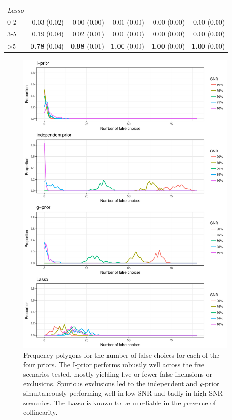 \documentclass[showframe,11pt,twoside,openright]{report}
\begin{document}
\begin{table}[htb]
\begin{tabular}{lrrrrr}
\\
\emph{Lasso}\\
\hspace{0.5em}0-2 & 0.03 (0.02) & 0.00 (0.00) & 0.00 (0.00) & 0.00 (0.00) & 0.00 (0.00) \\
\hspace{0.5em}3-5 & 0.19 (0.04) & 0.02 (0.01) & 0.00 (0.00) & 0.00 (0.00) & 0.00 (0.00) \\
\hspace{0.5em}>5  & \textbf{0.78} (0.04) & \textbf{0.98} (0.01) & \textbf{1.00} (0.00) & \textbf{1.00} (0.00) & \textbf{1.00} (0.00) \\ 
\bottomrule
\end{tabular}
\end{table}

\begin{figure}[p]
  \centering
  \includegraphics[width=0.991\textwidth]{figure/bvs_simres}
  \caption[Frequency polygons for the number of false choices]{Frequency polygons for the number of false choices for each of the four priors. The I-prior performs robustly well across the five scenarios tested, mostly yielding five or fewer false inclusions or exclusions. Spurious exclusions led to the independent and $g$-prior simultaneously performing well in low SNR and  badly in high SNR scenarios. The Lasso is known to be unreliable in the presence of collinearity.}
  \label{fig:simres}
\end{figure}
\end{document}
